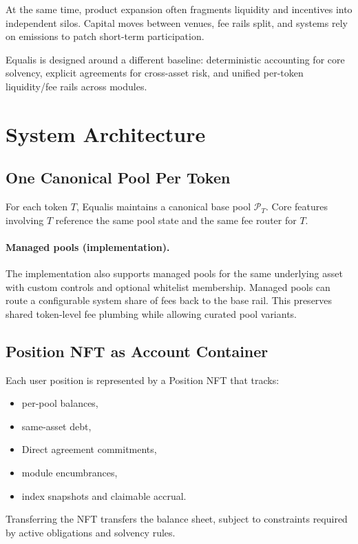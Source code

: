 \documentclass[version=preprint]{iacrcc}
\begin{document}
At the same time, product expansion often fragments liquidity and incentives into independent silos. Capital moves between venues, fee rails split, and systems rely on emissions to patch short-term participation.

Equalis is designed around a different baseline: deterministic accounting for core solvency, explicit agreements for cross-asset risk, and unified per-token liquidity/fee rails across modules.

\section{System Architecture}

\subsection{One Canonical Pool Per Token}

For each token $T$, Equalis maintains a canonical base pool $\mathcal{P}_T$. Core features involving $T$ reference the same pool state and the same fee router for $T$.

\paragraph{Managed pools (implementation).}
The implementation also supports managed pools for the same underlying asset with custom controls and optional whitelist membership. Managed pools can route a configurable system share of fees back to the base rail. This preserves shared token-level fee plumbing while allowing curated pool variants.

\subsection{Position NFT as Account Container}

Each user position is represented by a Position NFT that tracks:
\begin{itemize}
  \item per-pool balances,
  \item same-asset debt,
  \item Direct agreement commitments,
  \item module encumbrances,
  \item index snapshots and claimable accrual.
\end{itemize}

Transferring the NFT transfers the balance sheet, subject to constraints required by active obligations and solvency rules.
\end{document}
